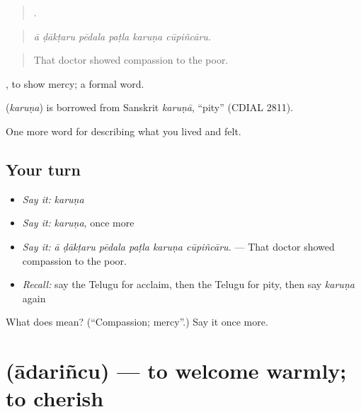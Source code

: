 \begin{quote}
     .
\end{quote}

\begin{quote}
\emph{ā ḍākṭaru pēdala paṭla karuṇa cūpiñcāru.}
\end{quote}

\begin{quote}
That doctor showed compassion to the poor.
\end{quote}

 , to show mercy; a formal word.

\begin{cousinweb}
\textbf{} (\emph{karuṇa}) is borrowed from Sanskrit \emph{karuṇā}, \textquotedblleft{}pity\textquotedblright{} (CDIAL 2811).
\end{cousinweb}

\begin{grammarlens}[title={What you've built}]
One more word for describing what you lived and felt.
\end{grammarlens}

\subsection*{Your turn}
\begin{itemize}
\raggedright
  \item \emph{Say it:} \emph{karuṇa}
  \item \emph{Say it:} \emph{karuṇa}, once more
  \item \emph{Say it:} \emph{ā ḍākṭaru pēdala paṭla karuṇa cūpiñcāru.} — That doctor showed compassion to the poor.
  \item \emph{Recall:} say the Telugu for acclaim, then the Telugu for pity, then say \emph{karuṇa} again
\end{itemize}

\begin{tcolorbox}[breakable,colback=teal!4,colframe=teal!35!black,title={Before you move on}]
What does  mean? (\textquotedblleft{}Compassion; mercy\textquotedblright{}.) Say it once more.
\end{tcolorbox}
\section[\texorpdfstring{\te{ఆదరించు} (ādariñcu)}{ఆదరించు (ādariñcu)}]{ (ādariñcu) — to welcome warmly; to cherish}

